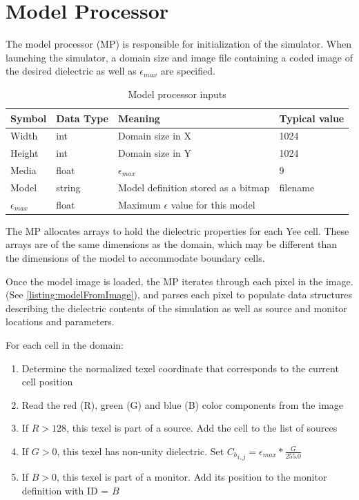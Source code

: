 \section{Model Processor}\label{sec:modelProcessor}

The model processor (MP) is responsible for initialization of the simulator. When launching the simulator, a domain size and image file containing a coded image of the desired dielectric as well as $\epsilon_{max}$ are specified.

\begin{table}[h!]
	\centering
	\caption{Model processor inputs}
	\label{tab:modelProcessorInputs}
	\begin{tabular}{l | l | l | l}
		Symbol	& Data Type & Meaning & Typical value				\\
		\hline														
		Width	& int 		& Domain size in X & 1024				\\
		Height	& int 		& Domain size in Y & 1024				\\
		Media	& float 	& $\epsilon_{max}$ & 9						\\
		Model	& string	& Model definition stored as a bitmap & filename \\
		$\epsilon_{max}$ & float & Maximum $\epsilon$ value for this model
	\end{tabular}
\end{table}

The MP allocates arrays to hold the dielectric properties for each Yee cell. These arrays are of the same dimensions as the domain, which may be different than the dimensions of the model to accommodate boundary cells.

Once the model image is loaded, the MP iterates through each pixel in the image. (See \autoref{listing:modelFromImage}), and parses each pixel to populate data structures describing the dielectric contents of the simulation as well as source and monitor locations and parameters.

For each cell in the domain:

\begin{enumerate}
	\item Determine the normalized texel coordinate that corresponds to the current cell position	
	\item Read the red (R), green (G) and blue (B) color components from the image
	\item If $R > 128$, this texel is part of a source. Add the cell to the list of sources
	\item If $G > 0$, this texel has non-unity dielectric. Set ${C_b}_{i,j} = \epsilon_{max} * \frac{G}{255.0}$
	\item If $B > 0$, this texel is part of a monitor. Add its position to the monitor definition with ID = $B$
\end{enumerate}

